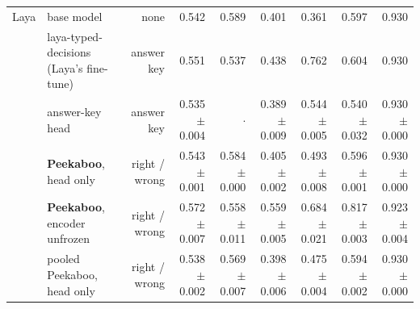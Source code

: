 \begin{table}[tbp]
{\begin{tabular}{llrrrrrrr}
\addlinespace
Laya & base model & none & 0.542 & 0.589 & 0.401 & 0.361 & 0.597 & 0.930 \\
 & laya-typed-decisions (Laya's fine-tune) & answer key & 0.551 & 0.537 & 0.438 & 0.762 & 0.604 & 0.930 \\
 & answer-key head & answer key & 0.535 {\scriptsize$\pm$0.004} & $\cdot$ & 0.389 {\scriptsize$\pm$0.009} & 0.544 {\scriptsize$\pm$0.005} & 0.540 {\scriptsize$\pm$0.032} & 0.930 {\scriptsize$\pm$0.000} \\
 & \textbf{Peekaboo}, head only & right / wrong & 0.543 {\scriptsize$\pm$0.001} & 0.584 {\scriptsize$\pm$0.000} & 0.405 {\scriptsize$\pm$0.002} & 0.493 {\scriptsize$\pm$0.008} & 0.596 {\scriptsize$\pm$0.001} & 0.930 {\scriptsize$\pm$0.000} \\
 & \textbf{Peekaboo}, encoder unfrozen & right / wrong & 0.572 {\scriptsize$\pm$0.007} & 0.558 {\scriptsize$\pm$0.011} & 0.559 {\scriptsize$\pm$0.005} & 0.684 {\scriptsize$\pm$0.021} & 0.817 {\scriptsize$\pm$0.003} & 0.923 {\scriptsize$\pm$0.004} \\
 & pooled Peekaboo, head only & right / wrong & 0.538 {\scriptsize$\pm$0.002} & 0.569 {\scriptsize$\pm$0.007} & 0.398 {\scriptsize$\pm$0.006} & 0.475 {\scriptsize$\pm$0.004} & 0.594 {\scriptsize$\pm$0.002} & 0.930 {\scriptsize$\pm$0.000} \\
\bottomrule
\end{tabular}}
\end{table}

